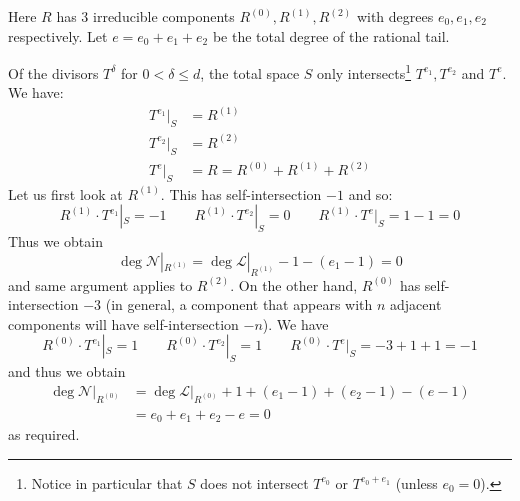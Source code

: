 \documentclass[11pt]{amsart}
\theoremstyle{definition}
\theoremstyle{definition}
\begin{document}
\begin{center}
\end{center}

Here $R$ has $3$ irreducible components $R^{(0)},R^{(1)},R^{(2)}$ with degrees $e_0,e_1,e_2$ respectively. Let $e = e_0+e_1+e_2$ be the total degree of the rational tail.

Of the divisors $T^{\delta}$ for $0<\delta\leq d$, the total space $S$ only intersects\footnote{Notice in particular that $S$ does not intersect $T^{e_0}$ or $T^{e_0+e_1}$ (unless $e_0=0$).} $T^{e_1}, T^{e_2}$ and $T^e$. We have:
\begin{align*}
T^{e_1}|_S & = R^{(1)} \\
T^{e_2}|_S & = R^{(2)} \\
T^e|_S & = R = R^{(0)} + R^{(1)} + R^{(2)}
\end{align*}
Let us first look at $R^{(1)}$. This has self-intersection $-1$ and so:
\begin{equation*} R^{(1)} \cdot T^{e_1}|_S = -1 \qquad R^{(1)} \cdot T^{e_2}|_S = 0 \qquad R^{(1)} \cdot T^e|_S = 1-1 = 0 \end{equation*}
Thus we obtain
\begin{equation*} \deg \mathcal{N}|_{R^{(1)}} = \deg \mathcal{L}|_{R^{(1)}} - 1 - (e_1 - 1) = 0 \end{equation*}
and same argument applies to $R^{(2)}$. On the other hand, $R^{(0)}$ has self-intersection $-3$ (in general, a component that appears with $n$ adjacent components will have self-intersection $-n$). We have
\begin{equation*} R^{(0)} \cdot T^{e_1}|_S = 1 \qquad R^{(0)} \cdot T^{e_2}|_S = 1 \qquad R^{(0)} \cdot T^e|_S = -3 + 1 + 1 = -1 \end{equation*}
and thus we obtain
\begin{align*} \deg \mathcal{N}|_{R^{(0)}} & = \deg \mathcal{L}|_{R^{(0)}} + 1 + (e_1 - 1) + (e_2 - 1) - (e-1) \\
& = e_0 + e_1 + e_2 - e = 0 \end{align*}
as required.
\end{document}
